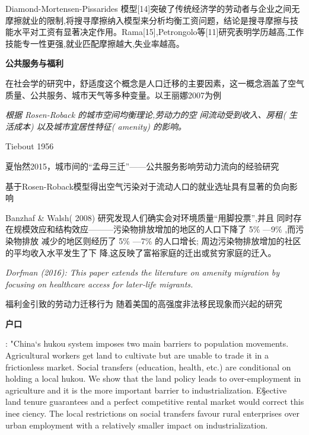 \documentclass[a4paper,12pt]{article}
\begin{document}
Diamond-Mortensen-Pissarides 模型[14]突破了传统经济学的劳动者与企业之间无摩擦就业的限制,将搜寻摩擦纳入模型来分析均衡工资问题，结论是搜寻摩擦与技能水平对工资有显著决定作用。Rama[15],Petrongolo等[11]研究表明学历越高,工作技能专一性更强,就业匹配摩擦越大,失业率越高。












\textbf{公共服务与福利}

在社会学的研究中，舒适度这个概念是人口迁移的主要因素，这一概念涵盖了空气质量、公共服务、城市天气等多种变量。以王丽娜2007为例

\textit{根据 Rosen-Roback 的城市空间均衡理论,劳动力的空 间流动受到收入、房租( 生活成本) 以及城市宜居性特征( amenity) 的影响。}

Tiebout 1956

夏怡然2015，城市间的“孟母三迁”——公共服务影响劳动力流向的经验研究
\cite{XiaYiRanChengShiJianDeMengMuSanQianGongGongFuWuYingXiangLaoDongLiLiuXiangDeJingYanYanJiu2015}

\cite{SunWeiZengKongQiWuRanYuLaoDongLiDeKongJianLiuDongJiYuLiuDongRenKouJiuYeXuanZhiXingWeiDeYanJiu2019}
基于Rosen-Roback模型得出空气污染对于流动人口的就业选址具有显著的负向影响

Banzhaf \& Walsh( 2008) 研究发现人们确实会对环境质量“用脚投票”,并且 同时存在规模效应和结构效应———污染物排放增加的地区的人口下降了 5\% —9\% ,而污染物排放 减少的地区则经历了 5\% —7\% 的人口增长; 周边污染物排放增加的社区的平均收入水平发生了下 降,这反映了富裕家庭的迁出或贫穷家庭的迁入。


\textit{Dorfman (2016): This paper extends the literature on amenity migration by focusing on healthcare access for later‐life migrants.}


福利金引致的劳动力迁移行为
\cite{benjaminImportingPoorWelfare2004}
\cite{mckinnishWelfareinducedMigrationState2007}
随着美国的高强度非法移民现象而兴起的研究







\textbf{户口}

\cite{ngaiChinasMobilityBarriers2019}: "China‘s hukou system imposes two main barriers to population movements. Agricultural workers get land to cultivate but are unable to trade it in a frictionless market. Social transfers (education, health, etc.) are conditional on holding a local hukou. We show that the land policy leads to over-employment in agriculture and it is the more important barrier to industrialization. E§ective land tenure guarantees and a perfect competitive rental market would correct this ine¢ ciency. The local restrictions on social transfers favour rural enterprises over urban employment with a relatively smaller impact on industrialization.
\end{document}
